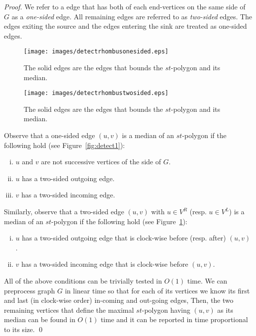 \documentclass{myllncs-mixalis}
\begin{document}
\begin{proof}


We refer to a edge that has both of each end-vertices on the same
side of $G$ as a \emph{one-sided} edge. All remaining edges are
referred to as \emph{two-sided} edges. The edges exiting the source
and the edges entering the sink are treated as one-sided edges.

\begin{figure}[htb]
    \begin{minipage}{0.45\textwidth}
    \centering
    \texttt{[image: images/detectrhombusonesided.eps]}
    \caption{The solid edges are the edges that bounds the $st$-polygon and its median.}
    \label{fig:detect1}
  \end{minipage}
  \hfill
  \begin{minipage}{0.45\textwidth}
    \centering
    \texttt{[image: images/detectrhombustwosided.eps]}
    \caption{The solid edges are the edges that bounds the $st$-polygon and its median.}
    \label{fig:detect2}
  \end{minipage}
\end{figure}

Observe that a one-sided edge $(u,v)$ is a median of an $st$-polygon
if the following hold (see Figure~\ref{fig:detect1}):
\vspace*{-0.4cm}
\begin{enumerate}[(i)]
\item $u$ and $v$ are not successive vertices of the side of $G$.
\item $u$ has a two-sided outgoing edge.
\item $v$ has a two-sided incoming edge.
\end{enumerate}

Similarly, observe that a two-sided edge $(u,v)$ with $u \in V^R$
(resp.  $u \in V^L$) is a median of an $st$-polygon if the following
hold (see Figure~\ref{fig:detect2}): \vspace*{-0.4cm}
\begin{enumerate}[(i)]
\item $u$ has a two-sided outgoing edge that is clock-wise before (resp. after)
$(u,v)$ .
\item $v$ has a two-sided incoming edge that is clock-wise before $(u,v)$.
\end{enumerate}

All of the above conditions can be trivially tested in $O(1)$ time.
We can preprocess graph $G$ in linear time so that for each of its
vertices  we know its first and last (in clock-wise order) in-coming
and out-going edges, Then, the two remaining vertices that define
the maximal $st$-polygon having $(u,v)$ as its median can be found
in $O(1)$ time and it can be reported in time proportional to its
size. \qed
\end{proof}
\end{document}

